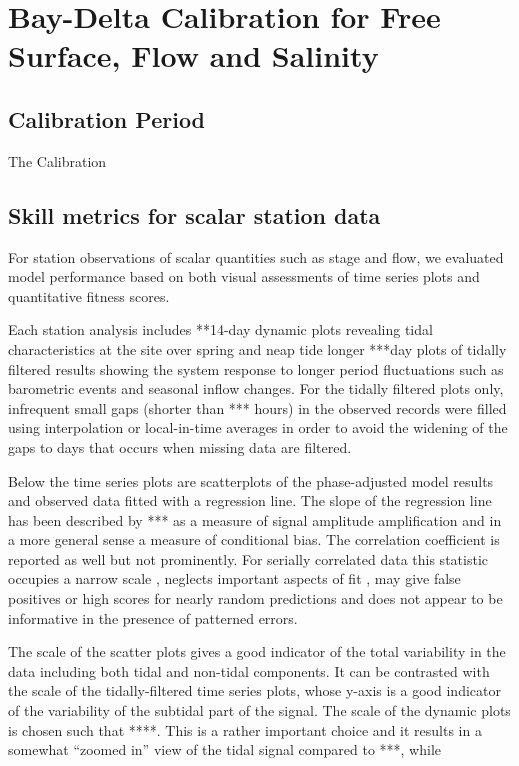 

\chapter{Bay-Delta Calibration for Free Surface, Flow and Salinity}

\section{Calibration Period}
The Calibration 

\section{Skill metrics for scalar station data}
For station observations of scalar quantities such as stage and flow, 
we evaluated model performance based on both visual assessments of time series plots and 
quantitative fitness scores. 

Each station analysis includes **14-day dynamic plots revealing tidal characteristics 
at the site over spring and neap tide longer ***day plots of tidally filtered results showing the
system response to longer period fluctuations such as barometric events and seasonal
inflow changes. For the tidally filtered plots only, infrequent small gaps (shorter than *** hours)
in the observed records were filled using interpolation or local-in-time averages 
in order to avoid the widening of the gaps to days that occurs when missing data are filtered. 

Below the time series plots are scatterplots of the phase-adjusted model results 
and observed data fitted with a regression line. The slope of the regression line has been
described by *** as a measure of signal amplitude amplification and in a more 
general sense a measure of conditional bias.  The correlation coefficient 
is reported as well but not prominently. For serially correlated data 
this statistic occupies a narrow scale \cite{Ralston2006}, neglects important aspects of fit
\citep{Murphy88}, may give false positives or high scores for nearly random predictions \citep{Ralston2006}
and does not appear to be informative in the presence of patterned errors. 

The scale of the scatter plots gives a good indicator of the total variability in the data 
including both tidal and non-tidal components. It can be contrasted with the scale of the 
tidally-filtered time series plots, whose y-axis is a good indicator of the variability of
the subtidal part of the signal. The scale of the dynamic plots is chosen such that ****. 
This is a rather important choice and it results in a somewhat "`zoomed in"' view of the tidal 
signal compared to ***, while


